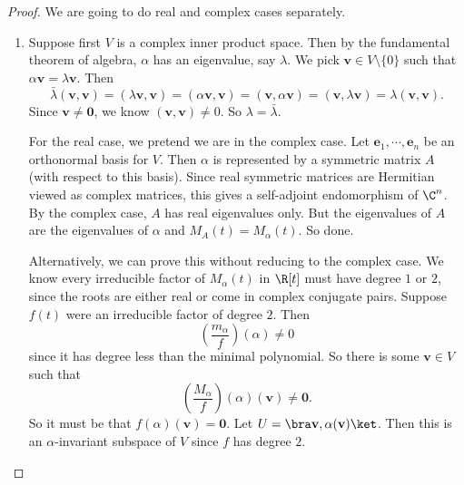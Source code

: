 \documentclass[a4paper]{article}
\begin{document}
\begin{proof}
  We are going to do real and complex cases separately.
  \begin{enumerate}
    \item Suppose first $V$ is a complex inner product space. Then by the fundamental theorem of algebra, $\alpha$ has an eigenvalue, say $\lambda$. We pick $\mathbf{v} \in V\setminus \{0\}$ such that $\alpha \mathbf{v} = \lambda \mathbf{v}$. Then
      \[
        \bar{\lambda}(\mathbf{v}, \mathbf{v}) = (\lambda \mathbf{v}, \mathbf{v}) = (\alpha \mathbf{v}, \mathbf{v}) = (\mathbf{v}, \alpha \mathbf{v}) = (\mathbf{v}, \lambda \mathbf{v}) = \lambda (\mathbf{v}, \mathbf{v}).
      \]
      Since $\mathbf{v}\not= \mathbf{0}$, we know $(\mathbf{v}, \mathbf{v})\not= 0$. So $\lambda = \bar{\lambda}$.

      For the real case, we pretend we are in the complex case. Let $\mathbf{e}_1, \cdots, \mathbf{e}_n$ be an orthonormal basis for $V$. Then $\alpha$ is represented by a symmetric matrix $A$ (with respect to this basis). Since real symmetric matrices are Hermitian viewed as complex matrices, this gives a self-adjoint endomorphism of $\C^n$. By the complex case, $A$ has real eigenvalues only. But the eigenvalues of $A$ are the eigenvalues of $\alpha$ and $M_A(t) = M_\alpha(t)$. So done.

      Alternatively, we can prove this without reducing to the complex case. We know every irreducible factor of $M_\alpha(t)$ in $\R[t]$ must have degree $1$ or $2$, since the roots are either real or come in complex conjugate pairs. Suppose $f(t)$ were an irreducible factor of degree $2$. Then
      \[
        \left(\frac{m_\alpha}{f}\right)(\alpha) \not= 0
      \]
      since it has degree less than the minimal polynomial. So there is some $\mathbf{v} \in V$ such that
      \[
        \left(\frac{M_\alpha}{f}\right)(\alpha)(\mathbf{v}) \not= \mathbf{0}.
      \]
      So it must be that $f(\alpha)(\mathbf{v}) = \mathbf{0}$. Let $U = \bra \mathbf{v}, \alpha (\mathbf{v})\ket$. Then this is an $\alpha$-invariant subspace of $V$ since $f$ has degree $2$.


\end{enumerate}
\end{proof}
\end{document}
